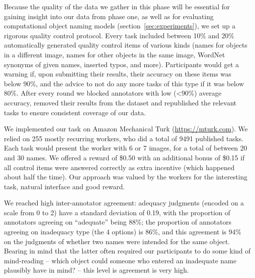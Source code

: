 Because the quality of the data we gather in this phase will be essential for gaining insight into our data from phase one, as well as for evaluating computational object naming models (section~\ref{sec:experiments}), we set up a rigorous quality control protocol.
Every task included between 10\% and 20\% automatically generated quality control items of various kinds (names for objects in a different image, names for other objects in the same image, WordNet synonyms of given names, inserted typos, and more).
Participants would get a warning if, upon submitting their results, their accuracy on these items was below 90\%, and the advice to not do any more tasks of this type if it was below 80\%.
After every round we blocked annotators with low (<90\%) average accuracy, removed their results from the dataset and republished the relevant tasks to ensure consistent coverage of our data.

We implemented our task on Amazon Mechanical Turk (\url{https://mturk.com}).
We relied on 255 mostly recurring workers, who did a total of 9491 published tasks.
Each task would present the worker with 6 or 7 images, for a total of between 20 and 30 names.
We offered a reward of \$0.50 with an additional bonus of \$0.15 if all control items were answered correctly as extra incentive (which happened about half the time).
Our approach was valued by the workers for the interesting task, natural interface and good reward.

We reached high inter-annotator agreement: adequacy judgments (encoded on a scale from 0 to 2) have a standard deviation of 0.19, with the proportion of annotators agreeing on ``adequate'' being 88\%; the proportion of annotators agreeing on inadequacy type (the 4 options) is 86\%, and this agreement is 94\% on the judgments of whether two names were intended for the same object.
Bearing in mind that the latter often required our participants to do some kind of mind-reading -- which object could someone who entered an inadequate name plausibly have in mind? -- this level is agreement is very high.

